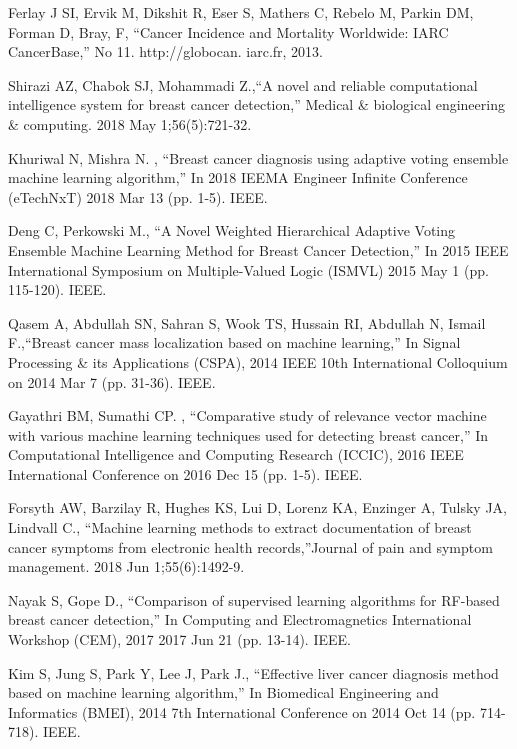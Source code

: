 \documentclass[conference]{IEEEtran}
\begin{document}
\begin{thebibliography}{00}
 Ferlay J SI, Ervik M, Dikshit R, Eser S, Mathers C, Rebelo M,
Parkin DM, Forman D, Bray, F, ``Cancer Incidence and
Mortality Worldwide: IARC CancerBase,'' No 11. http://globocan.
iarc.fr, 2013.

 Shirazi AZ, Chabok SJ, Mohammadi Z.,``A novel and reliable computational intelligence system for breast cancer detection,'' Medical \& biological engineering \& computing. 2018 May 1;56(5):721-32.

 Khuriwal N, Mishra N. , ``Breast cancer diagnosis using adaptive voting ensemble machine learning algorithm,'' In 2018 IEEMA Engineer Infinite Conference (eTechNxT) 2018 Mar 13 (pp. 1-5). IEEE.

 Deng C, Perkowski M., ``A Novel Weighted Hierarchical Adaptive Voting Ensemble Machine Learning Method for Breast Cancer Detection,'' In 2015 IEEE International Symposium on Multiple-Valued Logic (ISMVL) 2015 May 1 (pp. 115-120). IEEE.

 Qasem A, Abdullah SN, Sahran S, Wook TS, Hussain RI, Abdullah N, Ismail F.,``Breast cancer mass localization based on machine learning,'' In Signal Processing \& its Applications (CSPA), 2014 IEEE 10th International Colloquium on 2014 Mar 7 (pp. 31-36). IEEE.

 Gayathri BM, Sumathi CP. , ``Comparative study of relevance vector machine with various machine learning techniques used for detecting breast cancer,'' In Computational Intelligence and Computing Research (ICCIC), 2016 IEEE International Conference on 2016 Dec 15 (pp. 1-5). IEEE.
  
 Forsyth AW, Barzilay R, Hughes KS, Lui D, Lorenz KA, Enzinger A, Tulsky JA, Lindvall C., ``Machine learning methods to extract documentation of breast cancer symptoms from electronic health records,''Journal of pain and symptom management. 2018 Jun 1;55(6):1492-9.

 Nayak S, Gope D., ``Comparison of supervised learning algorithms for RF-based breast cancer detection,'' In Computing and Electromagnetics International Workshop (CEM), 2017 2017 Jun 21 (pp. 13-14). IEEE.

 Kim S, Jung S, Park Y, Lee J, Park J., ``Effective liver cancer diagnosis method based on machine learning algorithm,'' In Biomedical Engineering and Informatics (BMEI), 2014 7th International Conference on 2014 Oct 14 (pp. 714-718). IEEE.


\end{thebibliography}
\end{document}
